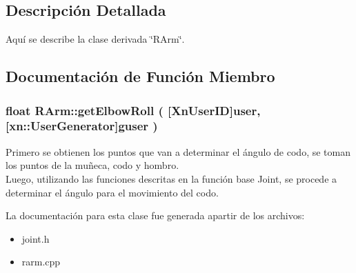 \subsection{\-Descripción \-Detallada}
\-Aquí se describe la clase derivada \char`\"{}\-RArm\char`\"{}. 

\subsection{\-Documentación de \-Función \-Miembro}
\hypertarget{class_r_arm_a5c91fecc7fea6e246ce87aac487bde4f}{
\subsubsection[{get\-Elbow\-Roll}]{\setlength{\rightskip}{0pt plus 5cm}float {\bf \-R\-Arm\-::get\-Elbow\-Roll} (
[{\-Xn\-User\-I\-D}]{user, }
[{xn\-::\-User\-Generator}]{guser}
)}}\label{class_r_arm_a5c91fecc7fea6e246ce87aac487bde4f}


\-Primero se obtienen los puntos que van a determinar el ángulo de codo, se toman los puntos de la muñeca, codo y hombro.\\
\-Luego, utilizando las funciones descritas en la función base Joint, se procede a determinar el ángulo para el movimiento del codo. 

\-La documentación para esta clase fue generada apartir de los archivos\-:\begin{itemize}
\item 
joint.\-h\item 
rarm.\-cpp\end{itemize}
